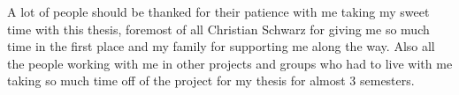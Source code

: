 \acknowledgements

A lot of people should be thanked for their patience with me taking my sweet time with this thesis, foremost of all Christian Schwarz for giving me so much time in the first place and my family for supporting me along the way. Also all the people working with me in other projects and groups who had to live with me taking so much time off of the project for my thesis for almost 3 semesters.